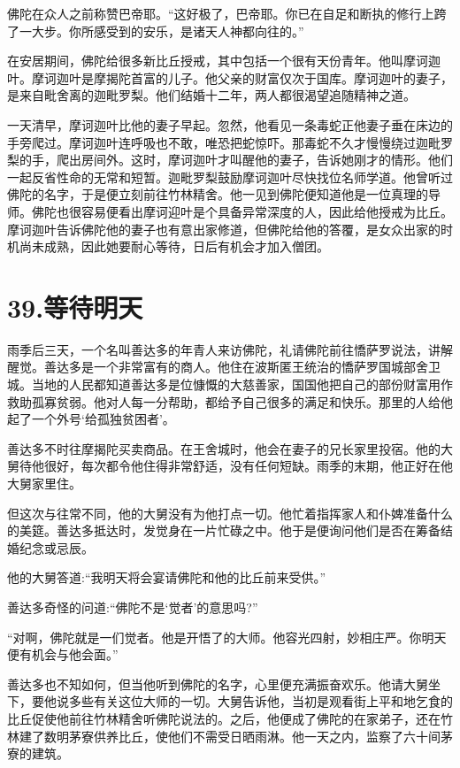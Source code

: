 \documentclass[12pt,twoside,openany]{book}
\begin{document}
佛陀在众人之前称赞巴帝耶。“这好极了，巴帝耶。你已在自足和断执的修行上跨了一大步。你所感受到的安乐，是诸天人神都向往的。”

在安居期间，佛陀给很多新比丘授戒，其中包括一个很有天份青年。他叫摩诃迦叶。摩诃迦叶是摩揭陀首富的儿子。他父亲的财富仅次于国库。摩诃迦叶的妻子，是来自毗舍离的迦毗罗梨。他们结婚十二年，两人都很渴望追随精神之道。

一天清早，摩诃迦叶比他的妻子早起。忽然，他看见一条毒蛇正他妻子垂在床边的手旁爬过。摩诃迦叶连呼吸也不敢，唯恐把蛇惊吓。那毒蛇不久才慢慢绕过迦毗罗梨的手，爬出房间外。这时，摩诃迦叶才叫醒他的妻子，告诉她刚才的情形。他们一起反省性命的无常和短暂。迦毗罗梨鼓励摩诃迦叶尽快找位名师学道。他曾听过佛陀的名字，于是便立刻前往竹林精舍。他一见到佛陀便知道他是一位真理的导师。佛陀也很容易便看出摩诃迎叶是个具备异常深度的人，因此给他授戒为比丘。摩诃迦叶告诉佛陀他的妻子也有意出家修道，但佛陀给他的答覆，是女众出家的时机尚未成熟，因此她要耐心等待，日后有机会才加入僧团。


\chapter{39.等待明天}\label{ch39}

雨季后三天，一个名叫善达多的年青人来访佛陀，礼请佛陀前往憍萨罗说法，讲解醒觉。善达多是一个非常富有的商人。他住在波斯匿王统治的憍萨罗国城部舍卫城。当地的人民都知道善达多是位慷慨的大慈善家，国国他把自己的部份财富用作救助孤寡贫弱。他对人每一分帮助，都给予自己很多的满足和快乐。那里的人给他起了一个外号‘给孤独贫困者’。

善达多不时往摩揭陀买卖商品。在王舍城时，他会在妻子的兄长家里投宿。他的大舅待他很好，每次都令他住得非常舒适，没有任何短缺。雨季的末期，他正好在他大舅家里住。

但这次与往常不同，他的大舅没有为他打点一切。他忙着指挥家人和仆婢准备什么的美筵。善达多抵达时，发觉身在一片忙碌之中。他于是便询问他们是否在筹备结婚纪念或忌辰。

他的大舅答道:“我明天将会宴请佛陀和他的比丘前来受供。”

善达多奇怪的问道:“佛陀不是‘觉者’的意思吗?”

“对啊，佛陀就是一们觉者。他是开悟了的大师。他容光四射，妙相庄严。你明天便有机会与他会面。”

善达多也不知如何，但当他听到佛陀的名字，心里便充满振奋欢乐。他请大舅坐下，要他说多些有关这位大师的一切。大舅告诉他，当初是观看街上平和地乞食的比丘促使他前往竹林精舍听佛陀说法的。之后，他便成了佛陀的在家弟子，还在竹林建了数明茅寮供养比丘，使他们不需受日晒雨淋。他一天之内，监察了六十间茅寮的建筑。
\end{document}
